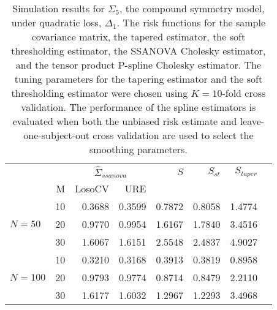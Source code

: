 \documentclass[12pt]{article}
\theoremstyle{definition}
\begin{document}
\begin{table}[ht]
\centering
\caption{Simulation results for $\Sigma_5$, the compound symmetry model, under quadratic loss, $\Delta_1$. The risk functions for the sample covariance matrix, the tapered estimator, the soft thresholding estimator, the SSANOVA Cholesky estimator, and the tensor product P-spline Cholesky estimator. The tuning parameters for the tapering estimator and the soft thresholding estimator were chosen using $K = 10$-fold cross validation. The performance of the spline estimators is evaluated when both the unbiased risk estimate and leave-one-subject-out cross validation are used to select the smoothing parameters.}
\begin{tabular}{l|r|rrrrrr}
&  & \multicolumn{2}{c}{$\hat{\Sigma}_{ssanova}$} & $S$ & $S_{st}$ & $S_{taper}$ \\ 
&M & \mbox{LosoCV} & \mbox{URE} &  \\ 
  \hline
 &    10 & 0.3688 & 0.3599	& 0.7872& 0.8058 & 1.4774 \\ 
$N = 50$ &    20 & 0.9770 &   0.9954	 & 1.6167& 1.7840 & 3.4516 \\ 
  &    30 & 1.6067 &	1.6151   &  2.5548 & 2.4837 & 4.9027 \\ \hdashline
  &    10 & 0.3210 & 0.3168 & 0.3913 & 0.3819 & 0.8958\\ 
  $N = 100$ &    20 & 0.9793 & 0.9774 &  0.8714 & 0.8479 & 2.2110\\ 
   &    30 & 1.6177 &  1.6032  & 1.2967  & 1.2293 & 3.4968\\ 
\end{tabular}
\end{table}

\end{document}
